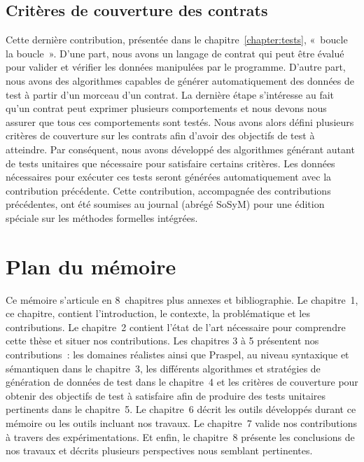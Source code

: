 \subsection{Critères de couverture des contrats}

Cette dernière contribution, présentée dans le chapitre~\ref{chapter:tests},
«~boucle la boucle~». D'une part, nous avons un langage de contrat qui peut être
évalué pour valider et vérifier les données manipulées par le programme. D'autre
part, nous avons des algorithmes capables de générer automatiquement des données
de test à partir d'un morceau d'un contrat. La dernière étape s'intéresse au
fait qu'un contrat peut exprimer plusieurs comportements et nous devons nous
assurer que tous ces comportements sont testés. Nous avons alors défini
plusieurs critères de couverture sur les contrats afin d'avoir des objectifs de
test à atteindre.  Par conséquent, nous avons développé des algorithmes générant
autant de tests unitaires que nécessaire pour satisfaire certains critères. Les
données nécessaires pour exécuter ces tests seront générées automatiquement avec
la contribution précédente. Cette contribution, accompagnée des contributions
précédentes, ont été soumises au journal  (abrégé SoSyM) pour une édition spéciale sur les méthodes formelles
intégrées.

\section{Plan du mémoire}

Ce mémoire s'articule en 8~chapitres plus annexes et bibliographie.  Le
chapitre~1, ce chapitre, contient l'introduction, le contexte, la problématique
et les contributions. Le chapitre~2 contient l'état de l'art nécessaire pour
comprendre cette thèse et situer nos contributions. Les chapitres 3 à 5
présentent nos contributions~: les domaines réalistes ainsi que Praspel, au
niveau syntaxique et sémantiquen dans le chapitre~3, les différents algorithmes
et stratégies de génération de données de test dans le chapitre~4 et les
critères de couverture pour obtenir des objectifs de test à satisfaire afin de
produire des tests unitaires pertinents dans le chapitre~5. Le chapitre~6 décrit
les outils développés durant ce mémoire ou les outils incluant nos travaux. Le
chapitre~7 valide nos contributions à travers des expérimentations. Et enfin, le
chapitre~8 présente les conclusions de nos travaux et décrits plusieurs
perspectives nous semblant pertinentes.
